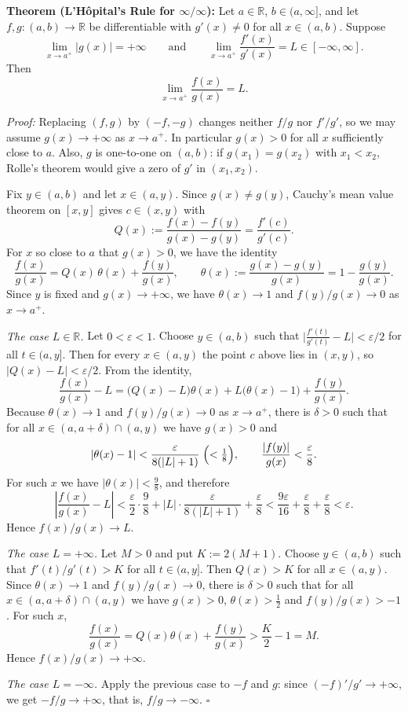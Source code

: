 \documentclass[a4paper,11pt,abstracton]{scrartcl}
\newcommand{\RR}{\mathbb{R}}
\theoremstyle{dotlessP}
\theoremstyle{dotlessS}
\theoremstyle{remark}
\theoremstyle{definition}
\begin{document}
\begin{problem_box}
\textbf{Theorem (L'H\^opital's Rule for $\infty/\infty$):}
Let $a\in\RR$, $b\in(a,\infty]$, and let $f,g:(a,b)\to\RR$ be differentiable with $g'(x)\ne0$ for all $x\in(a,b)$. Suppose
\[
    \lim_{x\to a^+}|g(x)|=+\infty
    \qquad\text{and}\qquad
    \lim_{x\to a^+}\frac{f'(x)}{g'(x)}=L\in[-\infty,\infty].
\]
Then
\[
    \lim_{x\to a^+}\frac{f(x)}{g(x)}=L.
\]
\end{problem_box}

\begin{claim_box}
\textit{Proof:}
Replacing $(f,g)$ by $(-f,-g)$ changes neither $f/g$ nor $f'/g'$, so we may assume $g(x)\to+\infty$ as $x\to a^+$. In particular $g(x)>0$ for all $x$ sufficiently close to $a$. Also, $g$ is one-to-one on $(a,b)$: if $g(x_1)=g(x_2)$ with $x_1<x_2$, Rolle's theorem would give a zero of $g'$ in $(x_1,x_2)$.

Fix $y\in(a,b)$ and let $x\in(a,y)$. Since $g(x)\ne g(y)$, Cauchy's mean value theorem on $[x,y]$ gives $c\in(x,y)$ with
\[
    Q(x):=\frac{f(x)-f(y)}{g(x)-g(y)}=\frac{f'(c)}{g'(c)}.
\]
For $x$ so close to $a$ that $g(x)>0$, we have the identity
\[
    \frac{f(x)}{g(x)}=Q(x)\,\theta(x)+\frac{f(y)}{g(x)},
    \qquad\theta(x):=\frac{g(x)-g(y)}{g(x)}=1-\frac{g(y)}{g(x)}.
\]
Since $y$ is fixed and $g(x)\to+\infty$, we have $\theta(x)\to1$ and $f(y)/g(x)\to0$ as $x\to a^+$.

\emph{The case $L\in\RR$.} Let $0<\varepsilon<1$. Choose $y\in(a,b)$ such that $\bigl|\frac{f'(t)}{g'(t)}-L\bigr|<\varepsilon/2$ for all $t\in(a,y]$. Then for every $x\in(a,y)$ the point $c$ above lies in $(x,y)$, so $|Q(x)-L|<\varepsilon/2$. From the identity,
\[
    \frac{f(x)}{g(x)}-L=\bigl(Q(x)-L\bigr)\theta(x)+L\bigl(\theta(x)-1\bigr)+\frac{f(y)}{g(x)}.
\]
Because $\theta(x)\to1$ and $f(y)/g(x)\to0$ as $x\to a^+$, there is $\delta>0$ such that for all $x\in(a,a+\delta)\cap(a,y)$ we have $g(x)>0$ and
\[
    |\theta(x)-1|<\frac{\varepsilon}{8(|L|+1)}\;\Bigl(<\tfrac18\Bigr),\qquad
    \frac{|f(y)|}{g(x)}<\frac\varepsilon8.
\]
For such $x$ we have $|\theta(x)|<\frac98$, and therefore
\[
    \left|\frac{f(x)}{g(x)}-L\right|<\frac\varepsilon2\cdot\frac98+|L|\cdot\frac{\varepsilon}{8(|L|+1)}+\frac\varepsilon8<\frac{9\varepsilon}{16}+\frac\varepsilon8+\frac\varepsilon8<\varepsilon.
\]
Hence $f(x)/g(x)\to L$.

\emph{The case $L=+\infty$.} Let $M>0$ and put $K:=2(M+1)$. Choose $y\in(a,b)$ such that $f'(t)/g'(t)>K$ for all $t\in(a,y]$. Then $Q(x)>K$ for all $x\in(a,y)$. Since $\theta(x)\to1$ and $f(y)/g(x)\to0$, there is $\delta>0$ such that for all $x\in(a,a+\delta)\cap(a,y)$ we have $g(x)>0$, $\theta(x)>\frac12$ and $f(y)/g(x)>-1$. For such $x$,
\[
    \frac{f(x)}{g(x)}=Q(x)\theta(x)+\frac{f(y)}{g(x)}>\frac K2-1=M.
\]
Hence $f(x)/g(x)\to+\infty$.

\emph{The case $L=-\infty$.} Apply the previous case to $-f$ and $g$: since $(-f)'/g'\to+\infty$, we get $-f/g\to+\infty$, that is, $f/g\to-\infty$.
\hfill$\square$
\end{claim_box}
\end{document}
